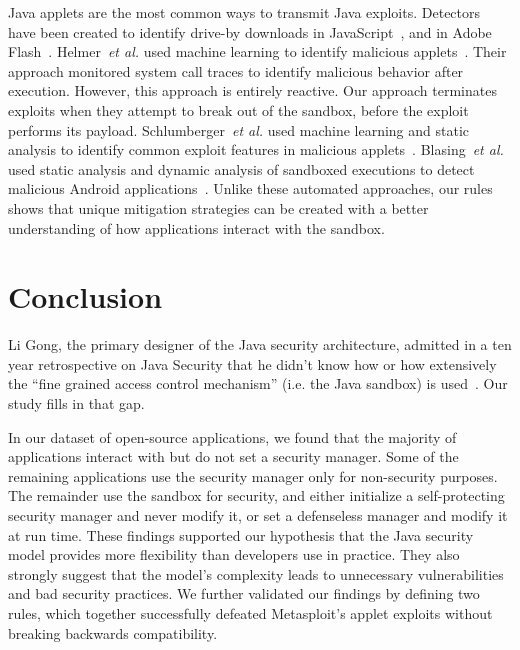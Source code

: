 \documentclass{sig-alternate}
\begin{document}
Java applets are the most common ways to transmit Java exploits. Detectors
have been created to identify drive-by downloads in JavaScript~\cite{cova_detection_2010},
and in Adobe Flash~\cite{ford_analyzing_2009}. Helmer~\emph{et al.} used
machine learning to identify malicious applets~\cite{helmer_anomalous_2001}.
Their approach monitored system call traces to identify malicious
behavior after execution. However, this approach is entirely reactive.
Our approach terminates exploits when they attempt to break out of
the sandbox, before the exploit performs its payload. Schlumberger~\emph{et al.} used machine learning and static analysis to identify common
exploit features in malicious applets~\cite{schlumberger_jarhead_2012}.
Blasing~\emph{et al.} used static analysis and dynamic analysis of sandboxed
executions to detect malicious Android applications~\cite{Blasing-AndriodSandbox}.
Unlike these automated approaches, our rules shows that unique
mitigation strategies can be created with a better understanding of
how applications interact with the sandbox. 

\section{Conclusion}\label{sec:Conclusion}

Li Gong, the primary designer of the Java security architecture,
admitted in a ten year retrospective on Java Security that he didn't
know how or how extensively the ``fine grained access control mechanism''
(i.e. the Java sandbox) is used~\cite{gong2009java}.
Our study fills in that gap.

In our dataset of open-source applications, we found
that the majority of applications interact with but do not set a security
manager. Some of the remaining applications use the security manager
only for non-security purposes. The remainder use
the sandbox for security, and either initialize a self-protecting security
manager and never modify it, or set a defenseless manager and modify
it at run time.  These findings supported our hypothesis that the Java security
model provides more flexibility than developers use in practice.  They also
strongly suggest that the model's complexity leads to unnecessary 
vulnerabilities and bad security practices. 
We further validated our findings by defining two rules, which together successfully
defeated Metasploit's applet exploits without breaking backwards compatibility.
\end{document}
